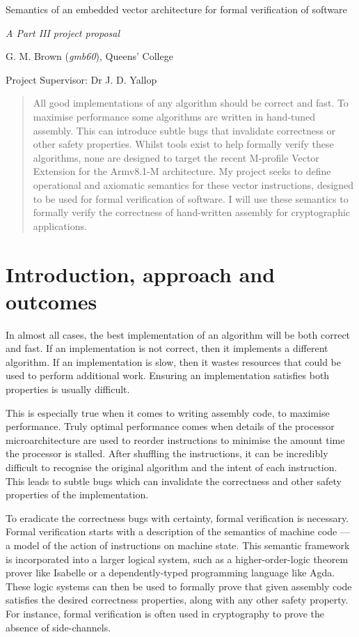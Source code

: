 \documentclass[11pt]{article}
\date{}
\title{}
\begin{document}
\centerline{\Large Semantics of an embedded vector architecture for formal verification of software}
\vspace{2em}
\centerline{\Large \emph{A Part III project proposal}}
\vspace{2em}
\centerline{\large G. M. Brown (\emph{gmb60}), Queens' College}
\vspace{1em}
\centerline{\large Project Supervisor: Dr J. D. Yallop}
\vspace{1em}

\begin{abstract}
All good implementations of any algorithm should be correct and fast. To
maximise performance some algorithms are written in hand-tuned assembly. This
can introduce subtle bugs that invalidate correctness or other safety
properties. Whilst tools exist to help formally verify these algorithms, none
are designed to target the recent M-profile Vector Extension for the Armv8.1-M
architecture. My project seeks to define operational and axiomatic semantics for
these vector instructions, designed to be used for formal verification of
software. I will use these semantics to formally verify the correctness of
hand-written assembly for cryptographic applications.
\end{abstract}

\section{Introduction, approach and outcomes}
\label{sec:orgdeb07e2}

In almost all cases, the best implementation of an algorithm will be both
correct and fast. If an implementation is not correct, then it implements a
different algorithm. If an implementation is slow, then it wastes resources
that could be used to perform additional work. Ensuring an implementation
satisfies both properties is usually difficult.

This is especially true when it comes to writing assembly code, to maximise
performance. Truly optimal performance comes when details of the processor
microarchitecture are used to reorder instructions to minimise the amount time
the processor is stalled. After shuffling the instructions, it can be
incredibly difficult to recognise the original algorithm and the intent of
each instruction. This leads to subtle bugs which can invalidate the
correctness and other safety properties of the implementation.

To eradicate the correctness bugs with certainty, formal verification is
necessary. Formal verification starts with a description of the semantics of
machine code --- a model of the action of instructions on machine state. This
semantic framework is incorporated into a larger logical system, such as a
higher-order-logic theorem prover like Isabelle or a dependently-typed
programming language like Agda. These logic systems can then be used to
formally prove that given assembly code satisfies the desired correctness
properties, along with any other safety property. For instance, formal
verification is often used in cryptography to prove the absence of
side-channels.
\end{document}
